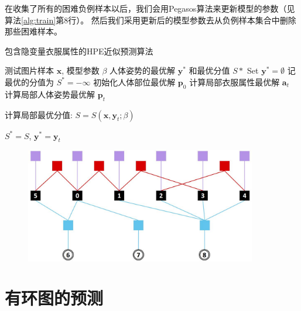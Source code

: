 在收集了所有的困难负例样本以后，我们会用Pegasos算法\cite{pegasos}来更新模型的参数（见算法\ref{alg:train}第8行）。
然后我们采用更新后的模型参数去从负例样本集合中删除那些困难样本。


\begin{algorithm}
\caption{包含隐变量衣服属性的HPE近似预测算法}
\begin{algorithmic}[1]
    \REQUIRE 测试图片样本 $\mathbf{x}$, 模型参数 $\beta$
    \ENSURE 人体姿势的最优解 $\mathbf{y}^*$ 和最优分值 $S*$
    \STATE Set $\mathbf{y}^* = \emptyset$
    \STATE 记最优的分值为 $S^* = -\infty$
    \STATE 初始化人体部位最优解 $\mathbf{p}_0$
    \REPEAT
        \STATE 计算局部衣服属性最优解 $\mathbf{a}_t$
        \STATE 计算局部人体姿势最优解 $\mathbf{p}_t$

        \STATE 计算局部最优分值: $S = S(\mathbf{x}, \mathbf{y}_t; \beta)$

            \STATE $S^* = S$, $\mathbf{y}^* = \mathbf{y}_t $
        \ENDIF
\end{algorithmic}
\label{alg:inference}
\end{algorithm}


\begin{figure}[tbp]
\centering
\includegraphics[width=0.9\textwidth]{img/whole-model.jpg}
\label{fig:graph}
\end{figure}

\section{有环图的预测}
\label{subsec:inference}

